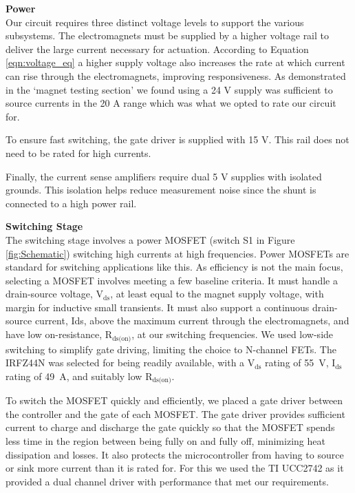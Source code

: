\documentclass[11pt]{article} %
\begin{document}
\textbf{Power}\\
Our circuit requires three distinct voltage levels to support the various subsystems. The electromagnets must be supplied by a higher voltage rail to deliver the large current necessary for actuation. According to Equation \ref{eqn:voltage_eq} a higher supply voltage also increases the rate at which current can rise through the electromagnets, improving responsiveness. As demonstrated in the ‘magnet testing section’ we found using a 24 V supply was sufficient to source currents in the 20 A range which was what we opted to rate our circuit for.  

To ensure fast switching, the gate driver is supplied with 15 V. This rail does not need to be rated for high currents.

Finally, the current sense amplifiers require dual 5 V supplies with isolated grounds. This isolation helps reduce measurement noise since the shunt is connected to a high power rail.

\textbf{Switching Stage}\\
The switching stage involves a power MOSFET (switch S1 in Figure \ref{fig:Schematic}) switching high currents at high frequencies. Power MOSFETs are standard for switching applications like this. As efficiency is not the main focus, selecting a MOSFET involves meeting a few baseline criteria. It must handle a drain-source voltage, $\text{V}_{\text{ds}}$, at least equal to the magnet supply voltage, with margin for inductive small transients. It must also support a continuous drain-source current, Ids, above the maximum current through the electromagnets, and have low on-resistance, $\text{R}_{\text{ds(on)}}$, at our switching frequencies. We used low-side switching to simplify gate driving, limiting the choice to N-channel FETs. The IRFZ44N was selected for being readily available, with a $\text{V}_{\text{ds}}$ rating of 55~V, $\text{I}_{\text{ds}}$ rating of 49~A, and suitably low $\text{R}_{\text{ds(on)}}$.

To switch the MOSFET quickly and efficiently, we placed a gate driver between the controller and the gate of each MOSFET. The gate driver provides sufficient current to charge and discharge the gate quickly so that the MOSFET spends less time in the region between being fully on and fully off, minimizing heat dissipation and losses. It also protects the microcontroller from having to source or sink more current than it is rated for. For this we used the TI UCC2742 as it provided a dual channel driver with performance that met our requirements.
\end{document}
